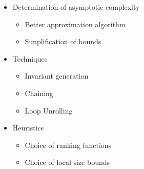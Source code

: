 \begin{itemize}[<+->]
\item Determination of asymptotic complexity
  \begin{itemize}
    \item Better approximation algorithm
    \item Simplification of bounds
  \end{itemize}
\item Techniques
  \begin{itemize}
  \item Invariant generation
  \item Chaining
  \item Loop Unrolling
  \end{itemize}
\item Heuristics
  \begin{itemize}
  \item Choice of ranking functions
  \item Choice of local size bounds
  \end{itemize}
\end{itemize}
